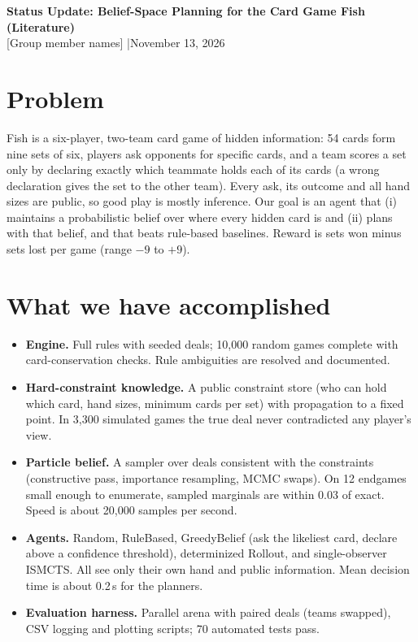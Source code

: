 \documentclass[10pt]{article}
\begin{document}
\begin{center}
  {\large\bfseries Status Update: Belief-Space Planning for the Card Game Fish (Literature)}\\[2pt]
  [Group member names] \quad|\quad November 13, 2026
\end{center}

\section*{Problem}
Fish is a six-player, two-team card game of hidden information: 54 cards form nine sets of six,
players ask opponents for specific cards, and a team scores a set only by declaring exactly which
teammate holds each of its cards (a wrong declaration gives the set to the other team). Every ask,
its outcome and all hand sizes are public, so good play is mostly inference. Our goal is an agent
that (i) maintains a probabilistic belief over where every hidden card is and (ii) plans with that
belief, and that beats rule-based baselines. Reward is sets won minus sets lost per game
(range $-9$ to $+9$).

\section*{What we have accomplished}
\begin{itemize}
  \item \textbf{Engine.} Full rules with seeded deals; 10,000 random games complete with
    card-conservation checks. Rule ambiguities are resolved and documented.
  \item \textbf{Hard-constraint knowledge.} A public constraint store (who can hold which card,
    hand sizes, minimum cards per set) with propagation to a fixed point. In 3,300 simulated games
    the true deal never contradicted any player's view.
  \item \textbf{Particle belief.} A sampler over deals consistent with the constraints
    (constructive pass, importance resampling, MCMC swaps). On 12 endgames small enough to
    enumerate, sampled marginals are within 0.03 of exact. Speed is about 20,000 samples per second.
  \item \textbf{Agents.} Random, RuleBased, GreedyBelief (ask the likeliest card, declare above a
    confidence threshold), determinized Rollout, and single-observer ISMCTS. All see only their own
    hand and public information. Mean decision time is about 0.2\,s for the planners.
  \item \textbf{Evaluation harness.} Parallel arena with paired deals (teams swapped), CSV logging
    and plotting scripts; 70 automated tests pass.
\end{itemize}
\end{document}
